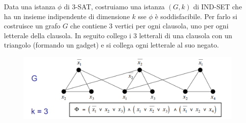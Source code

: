 Data una istanza $\phi$ di 3-SAT, costruiamo una istanza $(G, k)$ di IND-SET che ha un insieme indipendente di dimensione $k$ sse $\phi$ è soddisfacibile. 
Per farlo si costruisce un grafo $G$ che contiene 3 vertici per ogni clausola, uno per ogni letterale della clausola. In seguito collego i 3 letterali di una clausola con un triangolo (formando un gadget) e si collega ogni letterale al suo negato.
\begin{figure}[H]
    \centering
    \includegraphics[scale = 0.5]{imm/g-3.PNG}
    \label{fig:my_label2}
\end{figure}